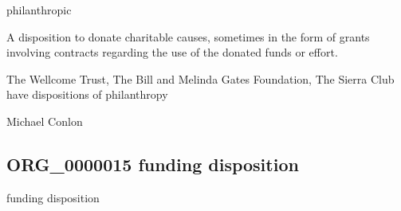 \documentclass[letterpaper,10pt,english]{sphinxmanual}
\begin{document}
\begin{sphinxShadowBox}

\sphinxAtStartPar
philanthropic
\end{sphinxShadowBox}

\begin{sphinxShadowBox}

\sphinxAtStartPar
A disposition to donate charitable causes, sometimes in the form of grants involving contracts regarding the use of the donated funds or effort.
\end{sphinxShadowBox}

\begin{sphinxShadowBox}

\sphinxAtStartPar
{}
\end{sphinxShadowBox}

\begin{sphinxShadowBox}

\sphinxAtStartPar
The Wellcome Trust, The Bill and Melinda Gates Foundation, The Sierra Club have dispositions of philanthropy
\end{sphinxShadowBox}

\begin{sphinxShadowBox}

\sphinxAtStartPar
Michael Conlon 
\end{sphinxShadowBox}
\begin{quote}

\ignorespaces \end{quote}


\subsection{ORG\_0000015 \sphinxhyphen{} funding disposition}
\label{\detokenize{doc-ORG_0000015:org-0000015-funding-disposition}}\label{\detokenize{doc-ORG_0000015:index-0}}\label{\detokenize{doc-ORG_0000015::doc}}
\begin{sphinxShadowBox}

\sphinxAtStartPar
funding disposition
\end{sphinxShadowBox}
\end{document}
